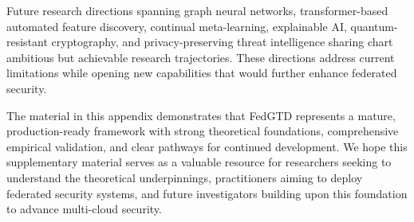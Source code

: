 \documentclass[12pt,a4paper]{article}
\theoremstyle{definition}
\begin{document}
Future research directions spanning graph neural networks, transformer-based automated feature discovery, continual meta-learning, explainable AI, quantum-resistant cryptography, and privacy-preserving threat intelligence sharing chart ambitious but achievable research trajectories. These directions address current limitations while opening new capabilities that would further enhance federated security.

The material in this appendix demonstrates that FedGTD represents a mature, production-ready framework with strong theoretical foundations, comprehensive empirical validation, and clear pathways for continued development. We hope this supplementary material serves as a valuable resource for researchers seeking to understand the theoretical underpinnings, practitioners aiming to deploy federated security systems, and future investigators building upon this foundation to advance multi-cloud security.
\end{document}
